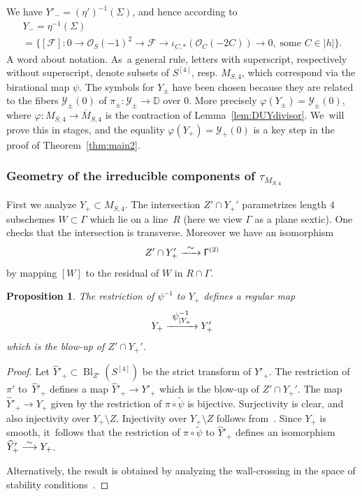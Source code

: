 \documentclass[11pt]{article}
\newcommand\To[1]{\mathchoice{\xrightarrow{\textstyle\kern4pt#1\kern3pt}}{\stackrel{#1}{\longrightarrow}}{}{}}
\let\raw\rightarrow
\newcommand{\DD}{{\mathbb D}}
\newcommand\cF{\mathcal{F}}
\newcommand\cO{\mathcal{O}}
\newcommand\cY{\mathcal{Y}}
\DeclareMathOperator{\Bl}{Bl}
\let\ov\overline
\let\phi\varphi
\let\wh\widehat
\let\wt\widetilde
\newtheorem{prop}[lemm]{Proposition}
\theoremstyle{definition}
\begin{document}
We have $Y'_{-}=(\eta')^{-1}(\Sigma)$, and hence according to~\cite[Prop.\,5.1]{involutions1}
\begin{multline}\label{eccoymeno}
Y_{-}=\eta^{-1}(\Sigma)\\
=\{[\cF] :0\raw \cO_S(-1)^{ 2}\raw \cF\raw \iota_{C,*}(\cO_C(-2C))\raw 0,\; \text{some $C\in|h|$} \}.
\end{multline}
A word about notation. As~a general rule, letters with superscript, respectively without superscript, denote subsets of $S^{[4]}$, resp. $M_{S,4}$, which correspond via the birational map $\psi$. The symbols for $Y_{\pm}$ have been chosen because they are related to the fibers $\cY_{\pm}(0)$ of $\pi_{\pm}\colon \cY_{\pm}\to\DD$ over $0$.
More precisely $\varphi(Y_{\pm})=\cY_{\pm}(0)$, where $\phi\colon M_{S,4}\to\ov{M}_{S,4}$ is the contraction of Lemma~\ref{lem:DUYdivisor}. We~will prove this in stages, and the equality $\varphi(Y_{+})=\cY_{+}(0)$ is a key step in the proof of Theorem~\ref{thm:main2}.

\subsubsection*{Geometry of the irreducible components of $\tau_{M_{S,4}}$}
First we analyze $Y_{+}\subset M_{S,4}$. The intersection $Z'\cap Y_+'$ parametrizes length $4$ subschemes $W\subset\mathsf{\Gamma}$ which lie on a line~$R$ (here we view $\mathsf{\Gamma}$ as a plane sextic).
One checks that the intersection is transverse. Moreover we have an isomorphism
\begin{equation*}
Z'\cap Y_+' \To{\sim} \mathsf{\Gamma}^{(2)}
\end{equation*}
by mapping $[W]$ to the residual of $W$ in
$R\cap\mathsf{\Gamma}$.

\begin{prop}\label{prop:ipspiublow}
The restriction of $\psi^{-1}$ to $Y_{+}$ defines a regular map
\begin{equation*}
Y_{+}\To{\psi^{-1}_{|Y_{+}}} Y'_{+}
\end{equation*}
which is the blow-up of $Z'\cap Y_+'$.
\end{prop}

\begin{proof}
Let $\wh{Y}'_{+}\subset\Bl_{Z'}(S^{[4]})$ be the strict transform of $Y'_{+}$. The restriction of $\pi'$ to~$\wh{Y}'_{+}$ defines a map $\wh{Y}'_{+}\to Y'_{+}$ which is the blow-up of $Z'\cap Y_+'$. The map
$\wh{Y}'_{+}\to Y_{+}$ given by the restriction of $\pi\circ\wt{\psi}$ is bijective.
Surjectivity is clear, and also injectivity over $Y_{+}\setminus Z$. Injectivity over $Y_{+}\setminus Z$ follows from~\cite[Prop.\,5.2]{involutions1}. Since $Y_{+}$ is smooth, it~follows that the restriction of $\pi\circ\wt{\psi}$ to $\wh{Y}'_{+}$ defines an isomorphism $\wh{Y}'_{+}\To{\sim} Y_{+}$.

Alternatively, the result is obtained by analyzing the wall-crossing in the space of stability conditions~\cite[\S 9]{BM:walls}.
\end{proof}
\end{document}
